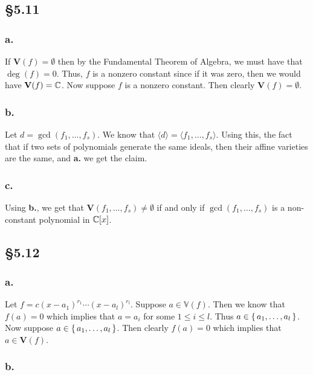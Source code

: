 \documentclass[letterpaper]{article}
\begin{document}
\subsection{\S 5.11}

\subsubsection{a.}

If $\textbf{V}(f) = \emptyset$ then by the Fundamental Theorem of Algebra, we must have that $\deg(f) = 0$. Thus, $f$ is a nonzero constant since if it was zero, then we would have $\textbf{V}(f) = \mathbb{C}$. Now suppose $f$ is a nonzero constant. Then clearly $\textbf{V}(f) = \emptyset$.

\subsubsection{b.}

Let $d = \gcd(f_{1}, \ldots, f_{s})$. We know that $\langle d \rangle = \langle f_{1}, \ldots, f_{s} \rangle$. Using this, the fact that if two sets of polynomials generate the same ideals, then their affine varieties are the same, and \textbf{a.} we get the claim.

\subsubsection{c.}

Using \textbf{b.}, we get that $\textbf{V}(f_{1}, \ldots, f_{s}) \neq \emptyset$ if and only if $\gcd(f_{1}, \ldots, f_{s})$ is a non-constant polynomial in $\mathbb{C}[x]$.

\subsection{\S 5.12}


\subsubsection{a.}

Let $f = c(x - a_{1})^{r_{1}} \cdots (x - a_{l})^{r_{l}}$. Suppose $a \in \mathbb{V}(f)$. Then we know that $f(a) = 0$ which implies that $a = a_{i}$ for some $1 \leq i \leq l$. Thus $a \in \set{a_{1}, \ldots, a_{l}}$. Now suppose $a \in \set{a_{1}, \ldots, a_{l}}$. Then clearly $f(a) = 0$ which implies that $a \in \textbf{V}(f)$.

\subsubsection{b.}
\end{document}
